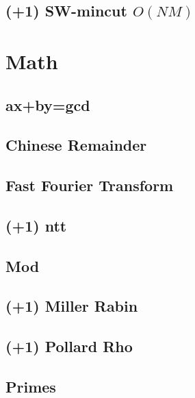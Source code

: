 \documentclass[10pt,twocolumn,oneside]{article}
\begin{document}
\subsection{(+1) SW-mincut $O(NM)$}


\section{Math}
\subsection{ax+by=gcd}


\subsection{Chinese Remainder}


\subsection{Fast Fourier Transform}


\subsection{(+1) ntt}


\subsection{Mod}


\subsection{(+1) Miller Rabin}


\newpage

\subsection{(+1) Pollard Rho}


\subsection{Primes}

\end{document}
